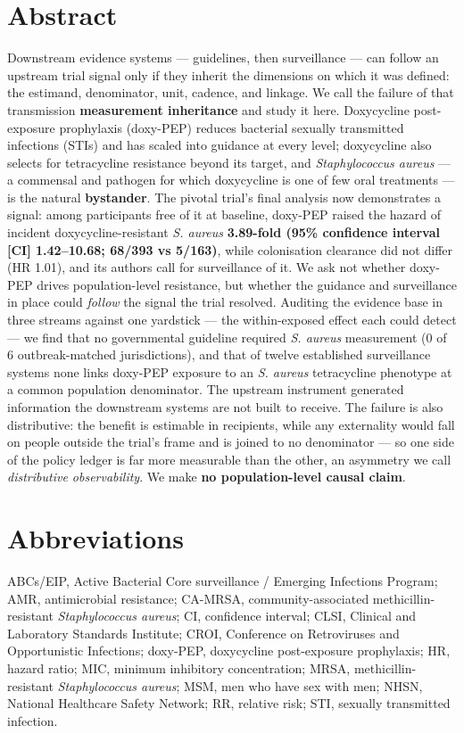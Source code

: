 \documentclass[10pt,letterpaper]{article}
\begin{document}
\section*{Abstract}
Downstream evidence systems --- guidelines, then surveillance --- can follow an upstream trial
signal only if they inherit the dimensions on which it was defined: the estimand, denominator,
unit, cadence, and linkage. We call the failure of that transmission \textbf{measurement
inheritance} and study it here. Doxycycline post-exposure prophylaxis (doxy-PEP) reduces bacterial sexually transmitted infections (STIs) and has scaled into guidance at every level; doxycycline also selects for tetracycline
resistance beyond its target, and \emph{Staphylococcus aureus} --- a commensal and pathogen for
which doxycycline is one of few oral treatments --- is the natural \textbf{bystander}. The pivotal
trial's final analysis now demonstrates a signal: among participants free of it at baseline,
doxy-PEP raised the hazard of incident doxycycline-resistant \emph{S. aureus} \textbf{3.89-fold
(95\% confidence interval [CI] 1.42--10.68; 68/393 vs 5/163)}, while colonisation clearance did not differ (HR 1.01), and
its authors call for surveillance of it. We ask not whether doxy-PEP drives population-level
resistance, but whether the guidance and surveillance in place could \emph{follow} the signal the
trial resolved. Auditing the evidence base in three streams against one yardstick --- the
within-exposed effect each could detect --- we find that no governmental guideline required \emph{S. aureus} measurement (0 of 6 outbreak-matched jurisdictions), and that of twelve established surveillance systems
none links doxy-PEP exposure to an \emph{S. aureus} tetracycline phenotype at a common population
denominator. The upstream instrument generated information the downstream systems are not built to
receive. The failure is also distributive: the benefit is estimable in recipients, while any
externality would fall on people outside the trial's frame and is joined to no denominator --- so one
side of the policy ledger is far more measurable than the other, an asymmetry we call \emph{distributive
observability}. We make \textbf{no population-level causal claim}.

\section*{Abbreviations}
ABCs/EIP, Active Bacterial Core surveillance / Emerging Infections Program; AMR, antimicrobial
resistance; CA-MRSA, community-associated methicillin-resistant \emph{Staphylococcus aureus}; CI,
confidence interval; CLSI, Clinical and Laboratory Standards Institute; CROI, Conference on
Retroviruses and Opportunistic Infections; doxy-PEP, doxycycline post-exposure prophylaxis; HR,
hazard ratio; MIC, minimum inhibitory concentration; MRSA, methicillin-resistant \emph{Staphylococcus
aureus}; MSM, men who have sex with men; NHSN, National Healthcare Safety Network; RR, relative risk;
STI, sexually transmitted infection.
\end{document}
